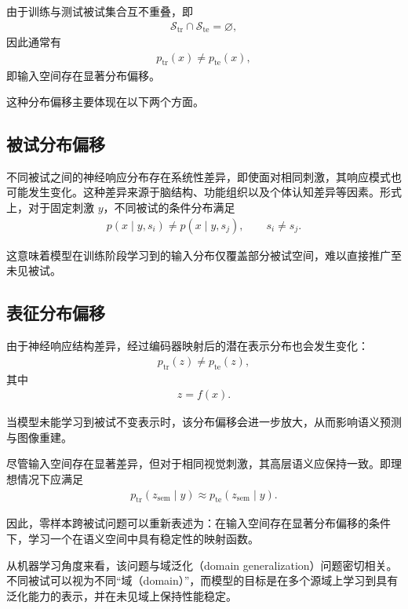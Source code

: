 由于训练与测试被试集合互不重叠，即
\begin{align}
  \mathcal{S}_{\mathrm{tr}} \cap \mathcal{S}_{\mathrm{te}} = \varnothing,
\end{align}
因此通常有
\begin{align}
  p_{\mathrm{tr}}(x) \neq p_{\mathrm{te}}(x),
\end{align}
即输入空间存在显著分布偏移。

这种分布偏移主要体现在以下两个方面。

\subsection{被试分布偏移}

不同被试之间的神经响应分布存在系统性差异，即使面对相同刺激，其响应模式也可能发生变化。这种差异来源于脑结构、功能组织以及个体认知差异等因素。形式上，对于固定刺激 $y$，不同被试的条件分布满足
\begin{align}
  p(x \mid y, s_i) \neq p(x \mid y, s_j), \qquad s_i \neq s_j.
\end{align}

这意味着模型在训练阶段学习到的输入分布仅覆盖部分被试空间，难以直接推广至未见被试。

\subsection{表征分布偏移}

由于神经响应结构差异，经过编码器映射后的潜在表示分布也会发生变化：
\begin{align}
  p_{\mathrm{tr}}(z) \neq p_{\mathrm{te}}(z),
\end{align}
其中
\begin{align}
  z = f(x).
\end{align}

当模型未能学习到被试不变表示时，该分布偏移会进一步放大，从而影响语义预测与图像重建。

尽管输入空间存在显著差异，但对于相同视觉刺激，其高层语义应保持一致。即理想情况下应满足
\begin{align}
  p_{\mathrm{tr}}(z_{\mathrm{sem}} \mid y) \approx p_{\mathrm{te}}(z_{\mathrm{sem}} \mid y).
\end{align}

因此，零样本跨被试问题可以重新表述为：在输入空间存在显著分布偏移的条件下，学习一个在语义空间中具有稳定性的映射函数。

从机器学习角度来看，该问题与域泛化（domain generalization）问题密切相关。不同被试可以视为不同“域（domain）”，而模型的目标是在多个源域上学习到具有泛化能力的表示，并在未见域上保持性能稳定。


